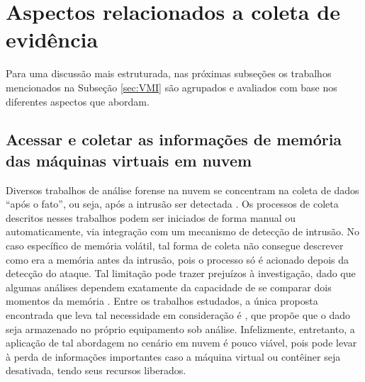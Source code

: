 \section{Aspectos relacionados a coleta de evidência}
\label{sec:coletadeevidencia}

Para uma discussão mais estruturada, nas próximas subseções os trabalhos mencionados na Subseção \ref{sec:VMI} são agrupados e avaliados com base nos diferentes aspectos que abordam.

\subsection{Acessar e coletar as informações de memória das máquinas virtuais em nuvem}
\label{sec:coletadeevidencia}

Diversos trabalhos de análise forense na nuvem se concentram na coleta de dados ``após o fato'', ou seja, após a intrusão ser detectada \cite{ReichertAutoAcquisition:2015,PoiselVMI:2013,DykstraFROST:2013,GeorgeDF2CE:2012,SangLogApproach:2013}. 
%
Os processos de coleta descritos nesses trabalhos podem ser iniciados de forma manual ou automaticamente, via integração com um mecanismo de detecção de intrusão. 
%
No caso específico de memória volátil, tal forma de coleta não consegue descrever como era a memória antes da intrusão, pois o processo só é acionado depois da detecção do ataque. 
%
Tal limitação pode trazer prejuízos à investigação, dado que algumas análises dependem exatamente da capacidade de se comparar dois momentos da memória \cite{CaseMemoryForensics:2014}. 
%
Entre os trabalhos estudados, a única proposta encontrada que leva tal necessidade em consideração é \cite{DezfouliBackupApproach:2012}, que propõe que o dado seja armazenado no próprio equipamento sob análise.
%
Infelizmente, entretanto, a aplicação de tal abordagem no cenário em nuvem é pouco viável, pois pode levar à perda de informações importantes caso a máquina virtual ou contêiner seja desativada, tendo seus recursos liberados.
%

